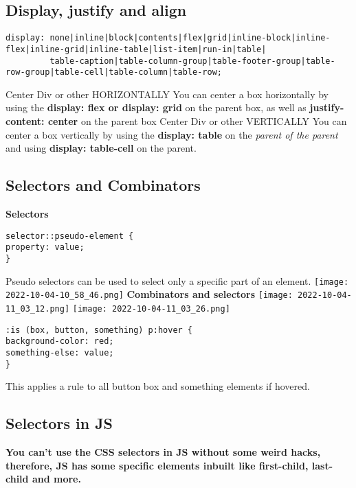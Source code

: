 \documentclass[main.tex,fontsize=6pt,paper=a4,paper=landscape,DIV=calc,]{scrartcl}
\begin{document}
\begin{multicols*}{4}
\subsection{Display, justify and align}
\vspace{-2mm}
\begin{lstlisting}
display: none|inline|block|contents|flex|grid|inline-block|inline-flex|inline-grid|inline-table|list-item|run-in|table|
         table-caption|table-column-group|table-footer-group|table-row-group|table-cell|table-column|table-row;
\end{lstlisting}
\vspace{2mm}
Center Div or other HORIZONTALLY \newline 
You can center a box horizontally by using the \textbf{display: flex or display: grid} on the parent box, as well as \textbf{justify-content: center} on the parent box\newline
Center Div or other VERTICALLY \newline 
You can center a box vertically by using the \textbf{display: table} on the \emph{parent of the parent} and using \textbf{display: table-cell} on the parent. 

\subsection{Selectors and Combinators}
\textbf{Selectors}
\vspace{-2mm}
\begin{lstlisting}
selector::pseudo-element {
property: value;
}
\end{lstlisting}
\vspace{2mm}
 Pseudo selectors can be used to select only a specific part of an element.
\texttt{[image: 2022-10-04-10\_58\_46.png]}
\textbf{Combinators and selectors}  
\texttt{[image: 2022-10-04-11\_03\_12.png]}\newline 
\texttt{[image: 2022-10-04-11\_03\_26.png]}
\vspace{-2mm}
\begin{lstlisting}
:is (box, button, something) p:hover {
background-color: red;
something-else: value;
}
\end{lstlisting}
\vspace{2mm}
 This applies a rule to all button box and something elements if hovered.

 \subsection{Selectors in JS}  
\textbf{You can't use the CSS selectors in JS without some weird hacks, therefore, JS has some specific elements inbuilt like first-child, last-child and more.}


\end{multicols*}
\end{document}
